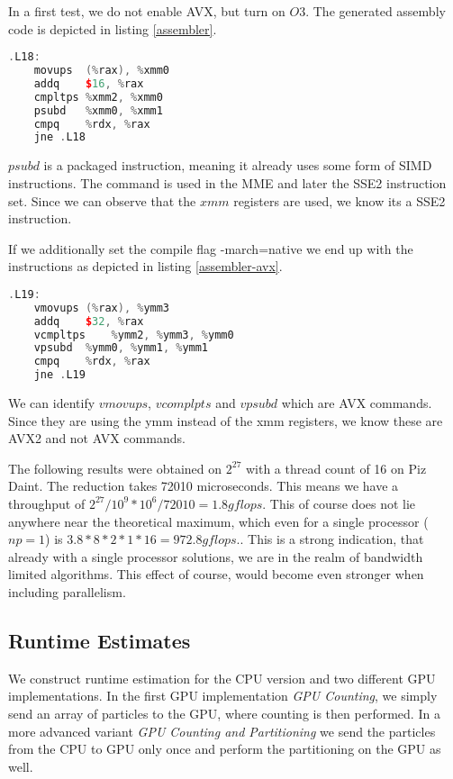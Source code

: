 \documentclass[]{article}
\begin{document}
In a first test, we do not enable AVX, but turn on $O3$. The generated assembly code is depicted in listing \ref{assembler}.

\begin{lstlisting}[language=c++, caption=Reduction Assembler Code without AVX, label=assembler]
.L18:
	movups	(%rax), %xmm0
	addq	$16, %rax
	cmpltps	%xmm2, %xmm0
	psubd	%xmm0, %xmm1
	cmpq	%rdx, %rax
	jne	.L18

\end{lstlisting}

$psubd$ is a packaged instruction, meaning it already uses some form of SIMD instructions. The command is used in the MME and later the SSE2 instruction set. Since we can observe that the $xmm$ registers are used, we know its a SSE2 instruction. 

If we additionally set the compile flag -march=native we end up with the instructions as depicted in listing \ref{assembler-avx}.

\begin{lstlisting}[language=c++, caption=Reduction Assembler Code with AVX2, label=assembler-avx]
.L19:
	vmovups	(%rax), %ymm3
	addq	$32, %rax
	vcmpltps	%ymm2, %ymm3, %ymm0
	vpsubd	%ymm0, %ymm1, %ymm1
	cmpq	%rdx, %rax
	jne	.L19	

\end{lstlisting}

We can identify $vmovups$, $vcomplpts$ and $vpsubd$ which are AVX commands. Since they are using the ymm instead of the xmm registers, we know these are AVX2 and not AVX commands.

The following results were obtained on $2^{27}$ with a thread count of 16 on Piz Daint. The reduction takes 72010 microseconds. This means we have a throughput of $2^{27} / 10^{9} * 10^6 / 72010 = 1.8 gflops$. This of course does not lie anywhere near the theoretical maximum, which even for a single processor ($np = 1$) is $3.8 * 8 * 2 * 1 * 16 = 972.8 gflops.$. This is a strong indication, that already with a single processor solutions, we are in the realm of bandwidth limited algorithms. This effect of course, would become even stronger when including parallelism.


\subsection{Runtime Estimates}

We construct runtime estimation for the CPU version and two different GPU implementations. In the first GPU implementation \textit{GPU Counting}, we simply send an array of particles to the GPU, where counting is then performed. In a more advanced variant \textit{GPU Counting and Partitioning} we send the particles from the CPU to GPU only once and perform the partitioning on the GPU as well.  
\end{document}
